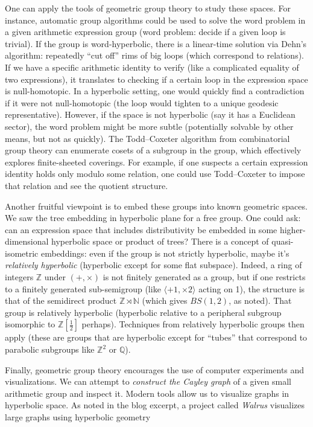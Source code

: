 \documentclass[11pt]{article}
\theoremstyle{remark}
\begin{document}
One can apply the tools of geometric group theory to study these spaces. For instance, automatic group algorithms could be used to solve the word problem in a given arithmetic expression group (word problem: decide if a given loop is trivial). If the group is word-hyperbolic, there is a linear-time solution via Dehn’s algorithm: repeatedly “cut off” rims of big loops (which correspond to relations). If we have a specific arithmetic identity to verify (like a complicated equality of two expressions), it translates to checking if a certain loop in the expression space is null-homotopic. In a hyperbolic setting, one would quickly find a contradiction if it were not null-homotopic (the loop would tighten to a unique geodesic representative). However, if the space is not hyperbolic (say it has a Euclidean sector), the word problem might be more subtle (potentially solvable by other means, but not as quickly). The Todd–Coxeter algorithm from combinatorial group theory can enumerate cosets of a subgroup in the group, which effectively explores finite-sheeted coverings. For example, if one suspects a certain expression identity holds only modulo some relation, one could use Todd–Coxeter to impose that relation and see the quotient structure.

Another fruitful viewpoint is to embed these groups into known geometric spaces. We saw the tree embedding in hyperbolic plane for a free group. One could ask: can an expression space that includes distributivity be embedded in some higher-dimensional hyperbolic space or product of trees? There is a concept of quasi-isometric embeddings: even if the group is not strictly hyperbolic, maybe it’s \textit{relatively hyperbolic} (hyperbolic except for some flat subspace). Indeed, a ring of integers $\mathbb{Z}$ under $(+, \times)$ is not finitely generated as a group, but if one restricts to a finitely generated sub-semigroup (like $\langle +1, \times 2\rangle$ acting on 1), the structure is that of the semidirect product $\mathbb{Z} \rtimes \mathbb{N}$ (which gives $BS(1,2)$, as noted). That group is relatively hyperbolic (hyperbolic relative to a peripheral subgroup isomorphic to $\mathbb{Z}[\frac{1}{2}]$ perhaps). Techniques from relatively hyperbolic groups then apply (these are groups that are hyperbolic except for “tubes” that correspond to parabolic subgroups like $\mathbb{Z}^2$ or $\mathbb{Q}$).

Finally, geometric group theory encourages the use of computer experiments and visualizations. We can attempt to \textit{construct the Cayley graph} of a given small arithmetic group and inspect it. Modern tools allow us to visualize graphs in hyperbolic space. As noted in the blog excerpt, a project called \textit{Walrus} visualizes large graphs using hyperbolic geometry
\end{document}
